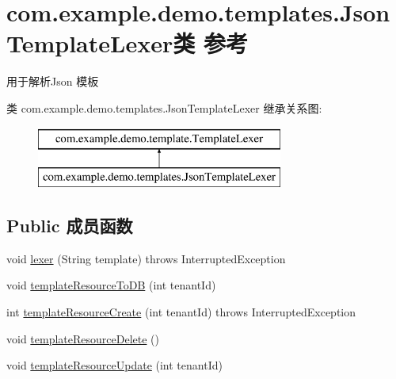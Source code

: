 \hypertarget{classcom_1_1example_1_1demo_1_1templates_1_1_json_template_lexer}{}\section{com.\+example.\+demo.\+templates.\+Json\+Template\+Lexer类 参考}
\label{classcom_1_1example_1_1demo_1_1templates_1_1_json_template_lexer}


用于解析\+Json 模板  


类 com.\+example.\+demo.\+templates.\+Json\+Template\+Lexer 继承关系图\+:\begin{figure}[H]
\begin{center}
\leavevmode
\includegraphics[height=2.000000cm]{classcom_1_1example_1_1demo_1_1templates_1_1_json_template_lexer}
\end{center}
\end{figure}
\subsection*{Public 成员函数}
\begin{DoxyCompactItemize}
\item 
void \mbox{\hyperlink{classcom_1_1example_1_1demo_1_1templates_1_1_json_template_lexer_a4f0fbcb833c9dda8248465d9a1baec59}{lexer}} (String template)  throws Interrupted\+Exception
\item 
void \mbox{\hyperlink{classcom_1_1example_1_1demo_1_1templates_1_1_json_template_lexer_aec3679c2b43a434f1e0249e53ba6dc33}{template\+Resource\+To\+DB}} (int tenant\+Id)
\item 
int \mbox{\hyperlink{classcom_1_1example_1_1demo_1_1templates_1_1_json_template_lexer_a3fa64b0be8178fbde35894629b1c2c04}{template\+Resource\+Create}} (int tenant\+Id)  throws Interrupted\+Exception
\item 
void \mbox{\hyperlink{classcom_1_1example_1_1demo_1_1templates_1_1_json_template_lexer_a3e398dd2757e699d1c12e170a88d2a8c}{template\+Resource\+Delete}} ()
\item 
void \mbox{\hyperlink{classcom_1_1example_1_1demo_1_1templates_1_1_json_template_lexer_a9be929460eadaa10ba1755ae9dbbffda}{template\+Resource\+Update}} (int tenant\+Id)
\end{DoxyCompactItemize}
